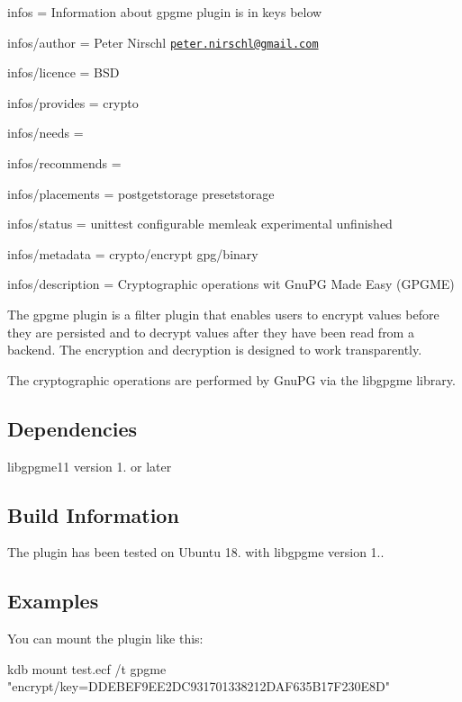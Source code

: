 
\begin{DoxyItemize}
\item infos = Information about gpgme plugin is in keys below
\item infos/author = Peter Nirschl \href{mailto:peter.nirschl@gmail.com}{\tt peter.\+nirschl@gmail.\+com}
\item infos/licence = B\+SD
\item infos/provides = crypto
\item infos/needs =
\item infos/recommends =
\item infos/placements = postgetstorage presetstorage
\item infos/status = unittest configurable memleak experimental unfinished
\item infos/metadata = crypto/encrypt gpg/binary
\item infos/description = Cryptographic operations wit Gnu\+PG Made Easy (G\+P\+G\+ME)
\end{DoxyItemize}

The {\ttfamily gpgme} plugin is a filter plugin that enables users to encrypt values before they are persisted and to decrypt values after they have been read from a backend. The encryption and decryption is designed to work transparently.

The cryptographic operations are performed by Gnu\+PG via the {\ttfamily libgpgme} library.

\subsection*{Dependencies}


\begin{DoxyItemize}
\item {\ttfamily libgpgme11} version 1. or later
\end{DoxyItemize}

\subsection*{Build Information}

The plugin has been tested on Ubuntu 18. with {\ttfamily libgpgme} version 1..

\subsection*{Examples}

You can mount the plugin like this\+: \begin{DoxyVerb}kdb mount test.ecf /t gpgme "encrypt/key=DDEBEF9EE2DC931701338212DAF635B17F230E8D"
\end{DoxyVerb}


